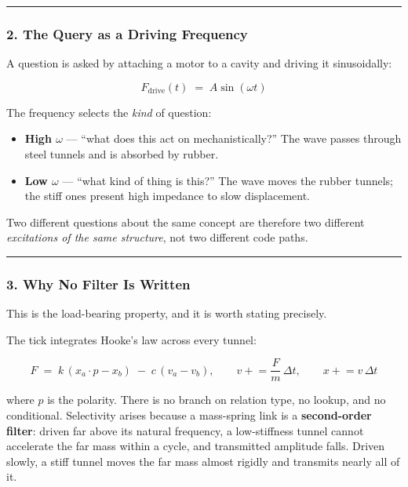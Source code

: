 \documentclass[
  11pt,
  a4paper,
]{article}
\providecommand{\tightlist}{%
  \setlength{\itemsep}{0pt}\setlength{\parskip}{0pt}}
\begin{document}
\begin{center}\rule{0.5\linewidth}{0.5pt}\end{center}

\subsubsection{2. The Query as a Driving
Frequency}\label{the-query-as-a-driving-frequency}

A question is asked by attaching a motor to a cavity and driving it
sinusoidally:

\[
F_{\text{drive}}(t) \;=\; A \sin(\omega t)
\]

The frequency selects the \emph{kind} of question:

\begin{itemize}
\tightlist
\item
  \textbf{High \(\omega\)} --- ``what does this act on
  mechanistically?'' The wave passes through steel tunnels and is
  absorbed by rubber.
\item
  \textbf{Low \(\omega\)} --- ``what kind of thing is this?'' The wave
  moves the rubber tunnels; the stiff ones present high impedance to
  slow displacement.
\end{itemize}

Two different questions about the same concept are therefore two
different \emph{excitations of the same structure}, not two different
code paths.

\begin{center}\rule{0.5\linewidth}{0.5pt}\end{center}

\subsubsection{3. Why No Filter Is
Written}\label{why-no-filter-is-written}

This is the load-bearing property, and it is worth stating precisely.

The tick integrates Hooke's law across every tunnel:

\[
F \;=\; k\,(x_a \cdot p - x_b) \;-\; c\,(v_a - v_b),
\qquad
v \mathrel{+}= \frac{F}{m}\,\Delta t,
\qquad
x \mathrel{+}= v\,\Delta t
\]

where \(p\) is the polarity. There is no branch on relation type, no
lookup, and no conditional. Selectivity arises because a mass-spring
link is a \textbf{second-order filter}: driven far above its natural
frequency, a low-stiffness tunnel cannot accelerate the far mass within
a cycle, and transmitted amplitude falls. Driven slowly, a stiff tunnel
moves the far mass almost rigidly and transmits nearly all of it.
\end{document}
